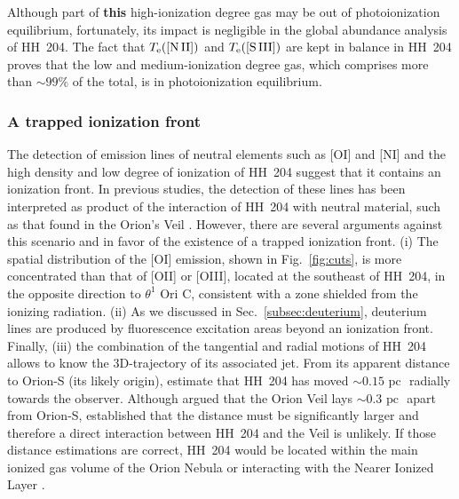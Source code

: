 \documentclass[twocolumn,linenumbers]{aastex63}
\newcommand{\cesar}[1]{{\color{red}C: #1}}
\begin{document}
Although part of \textbf{this} high-ionization degree gas may be out of photoionization equilibrium, fortunately, its impact is negligible in the global abundance analysis of HH~204. The fact that $T_{\rm e}(\text{[N\thinspace II]})$ and $T_{\rm e}(\text{[S\thinspace III]})$ are kept in balance in HH~204 proves that the low and medium-ionization degree gas, which comprises more than $\sim 99\%$ of the total, is in photoionization equilibrium.

\subsubsection{A trapped ionization front}
\label{subsubsec:trapped_IF}

The detection of emission lines of neutral elements such as [O\thinspace I] and [N\thinspace I] and the high density and low degree of ionization of HH~204 suggest that it contains an ionization front. In previous studies, the detection of these lines has been interpreted as product of the interaction of HH~204 with neutral material, such as that found in the Orion's Veil \citep[][]{ODell:1997a,odell97,takami02}. However, there are several arguments against this scenario and in favor of the existence of a trapped ionization front. (i) The spatial distribution of the [O\thinspace I] emission, shown in Fig.~\ref{fig:cuts}, is more concentrated than that of [O\thinspace II] or [O\thinspace III], located at the southeast of HH~204, in the opposite direction to $\theta^{1} \text{ Ori C}$, consistent with a zone shielded from the ionizing radiation. (ii) As we discussed in Sec.~\ref{subsec:deuterium}, deuterium lines are produced by fluorescence excitation areas beyond an ionization front. Finally, (iii) the combination of the tangential and radial motions of HH~204 allows to know the 3D-trajectory of its associated jet. From its apparent distance to Orion-S (its likely origin), \citet{Doi:2004a} estimate that HH~204 has moved $\sim 0.15 \text{ pc }$ radially towards the observer. Although \citet[][]{vanderWerf13} argued that the Orion Veil lays $\sim 0.3 \text{ pc }$ apart from Orion-S, \citet[][]{abel16} established that the distance must be significantly larger and therefore a direct interaction between HH~204 and the Veil is unlikely. If those distance estimations are correct, HH~204 would be located within the main ionized gas volume of the Orion Nebula or interacting with the Nearer Ionized Layer  \citep[NIL, see][]{Abel19,Odell20}. %
\end{document}
